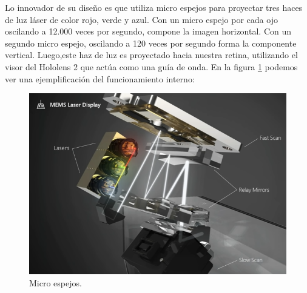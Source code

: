 \begin{table}[htpb]
	\centering
	\caption[Hardware Hololens 2]{Especificaciones técnicas Hololens 2}
	\label{tab:holotab}
\end{table}

Lo innovador de su diseño es que utiliza micro espejos para proyectar tres haces de luz láser de color rojo, verde y azul. Con un micro espejo por cada ojo oscilando a 12.000 veces por segundo, compone la imagen horizontal. Con un segundo micro espejo, oscilando a 120 veces por segundo forma la componente vertical. Luego,este haz de luz es proyectado hacia nuestra retina, utilizando el visor del Hololens 2 que actúa como una guía de onda. En la figura \ref{fig:Lasers} podemos ver una ejemplificación del funcionamiento interno:

\begin{figure}[htpb]
	\centering
	\includegraphics[width=\textwidth]{./Figures/Lasers.png}
	\caption{Micro espejos\protect\footnotemark.}
	\label{fig:Lasers}
\end{figure}

